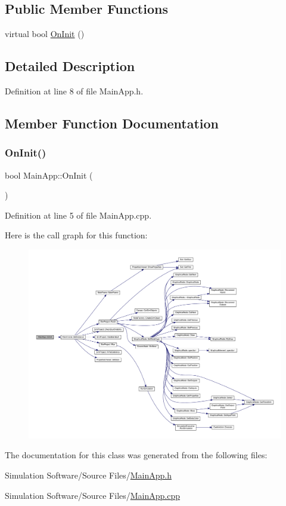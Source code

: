 \subsection*{Public Member Functions}
\begin{DoxyCompactItemize}
\item 
virtual bool \hyperlink{class_main_app_aff3d398e1b61f1016c37d57798f86731}{On\+Init} ()
\end{DoxyCompactItemize}


\subsection{Detailed Description}


Definition at line 8 of file Main\+App.\+h.



\subsection{Member Function Documentation}
\mbox{\label{class_main_app_aff3d398e1b61f1016c37d57798f86731}} 
\subsubsection{\texorpdfstring{On\+Init()}{OnInit()}}
{\footnotesize\ttfamily bool Main\+App\+::\+On\+Init (\begin{DoxyParamCaption}{ }\end{DoxyParamCaption})\hspace{0.3cm}{\ttfamily [virtual]}}



Definition at line 5 of file Main\+App.\+cpp.

Here is the call graph for this function\+:
\nopagebreak
\begin{figure}[H]
\begin{center}
\leavevmode
\includegraphics[width=350pt]{class_main_app_aff3d398e1b61f1016c37d57798f86731_cgraph}
\end{center}
\end{figure}


The documentation for this class was generated from the following files\+:\begin{DoxyCompactItemize}
\item 
Simulation Software/\+Source Files/\hyperlink{_main_app_8h}{Main\+App.\+h}\item 
Simulation Software/\+Source Files/\hyperlink{_main_app_8cpp}{Main\+App.\+cpp}\end{DoxyCompactItemize}
